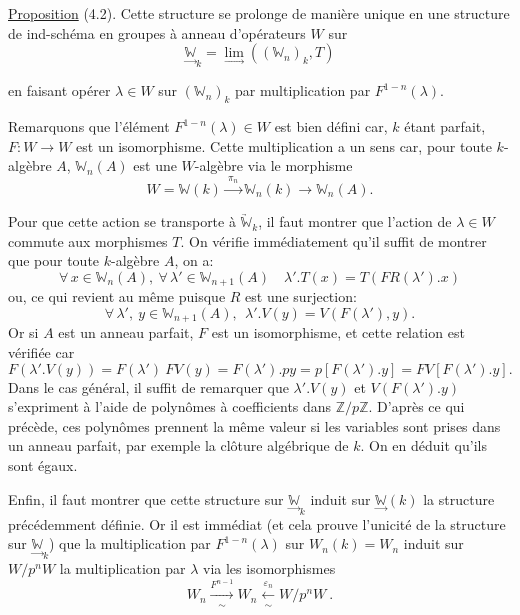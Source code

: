 \documentclass[11pt]{article}
\newcommand{\scanpage}[1]{\par\bigskip\noindent{\small\sffamily[scan #1]}\par}
\newcommand{\mspage}[1]{{\small\sffamily[p.\,#1]}}
\newcommand{\hand}[1]{\textcolor{blue}{#1}}
\newcommand{\uline}[1]{\underline{#1}}
\begin{document}
\uline{Proposition} (4.2). Cette structure se prolonge de manière unique en
une structure de ind-schéma en groupes à anneau d'opérateurs $W$ sur
\[ \underset{\to}{\mathbb{W}}_k = \underset{\to}{\lim}((\mathbb{W}_n)_k , T) \]

\mspage{\hand{8}}

\clearpage
\scanpage{129/9}
en faisant opérer $\lambda \in W$ sur $(\mathbb{W}_n)_k$ par multiplication par $F^{1-n}(\lambda)$.

Remarquons que l'élément $F^{1-n}(\lambda) \in W$ est bien défini car,
$k$ étant parfait, $F\colon W \to W$ est un isomorphisme. Cette multiplication
a un sens car, pour toute $k$-algèbre $A$, $\mathbb{W}_n(A)$ est une $W$-algèbre via le
morphisme
\[ W = \mathbb{W}(k) \xrightarrow{\ \pi_n\ } \mathbb{W}_n(k) \to \mathbb{W}_n(A) . \]

Pour que cette action se transporte à $\underrightarrow{\mathbb{W}}_k$, il faut montrer que
l'action de $\lambda \in W$ commute aux morphismes $T$. On vérifie immédiatement
qu'il suffit de montrer que pour toute $k$-algèbre $A$, on a:
\[ \forall\, x \in \mathbb{W}_n(A) ,\ \forall\, \lambda' \in \mathbb{W}_{n+1}(A) \quad \lambda'.T(x) = T(FR(\lambda').x) \]
ou, ce qui revient au même puisque $R$ est une surjection:
\[ \forall\, \lambda' ,\ y \in \mathbb{W}_{n+1}(A) ,\ \ \lambda'.V(y) = V(F(\lambda'),y) . \]
Or si $A$ est un anneau parfait, $F$ est un isomorphisme, et cette relation
est vérifiée car
\[ F(\lambda'.V(y)) = F(\lambda')\ FV(y) = F(\lambda').py = p[F(\lambda').y] = FV[F(\lambda').y]. \]
Dans le cas général, il suffit de remarquer que $\lambda'.V(y)$ et $V(F(\lambda').y)$
s'expriment à l'aide de polynômes à coefficients dans $\mathbb{Z}/p\mathbb{Z}$. D'après
ce qui précède, ces polynômes prennent la même valeur si les variables
sont prises dans un anneau parfait, par exemple la clôture algébrique
de $k$. On en déduit qu'ils sont égaux.

\mspage{\hand{9}}

\clearpage
\scanpage{129/10}
Enfin, il faut montrer que cette structure sur $\underset{\to}{\mathbb{W}}_k$ induit
sur $\underset{\to}{\mathbb{W}}(k)$ la structure précédemment définie. Or il est immédiat
(et cela prouve l'unicité de la structure sur $\underset{\to}{\mathbb{W}}_k$) que la multiplication
par $F^{1-n}(\lambda)$ sur $W_n(k) = W_n$ induit sur $W/p^nW$ la multiplication par
$\lambda$ via les isomorphismes
\[ W_n \xrightarrow[\sim]{F^{n-1}} W_n \xleftarrow[\sim]{\varepsilon_n} W/p^nW \ . \]
\end{document}
